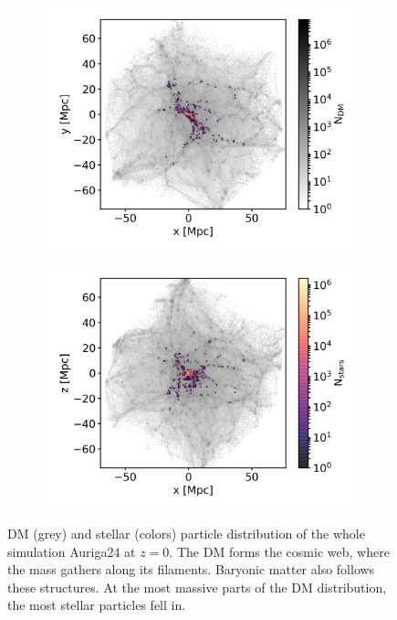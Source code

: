 \begin{figure}
    \centering
    \begin{subfigure}[b]{0.8\textwidth}
	    \includegraphics[width=\textwidth]{plots/Auriga/DM_and_stars_xy_distribution.png}
	    \label{fig:DM_stars_xy}
    \end{subfigure}
    
    \begin{subfigure}[b]{0.8\textwidth}
    \centering
    	\includegraphics[width=\textwidth]{plots/Auriga/DM_and_stars_xz_distribution.png}
    	\label{fig:DM_stars_xy}
    \end{subfigure}
    \caption{\ac{DM} (grey) and stellar (colors) particle distribution of the whole simulation Auriga24 at $\textit{z}=0$. The \ac{DM} forms the cosmic web, where the mass gathers along its filaments. Baryonic matter also follows these structures. At the most massive parts of the \ac{DM} distribution, the most stellar particles fell in. }\label{fig:DM_stars_AU24}
\end{figure}


